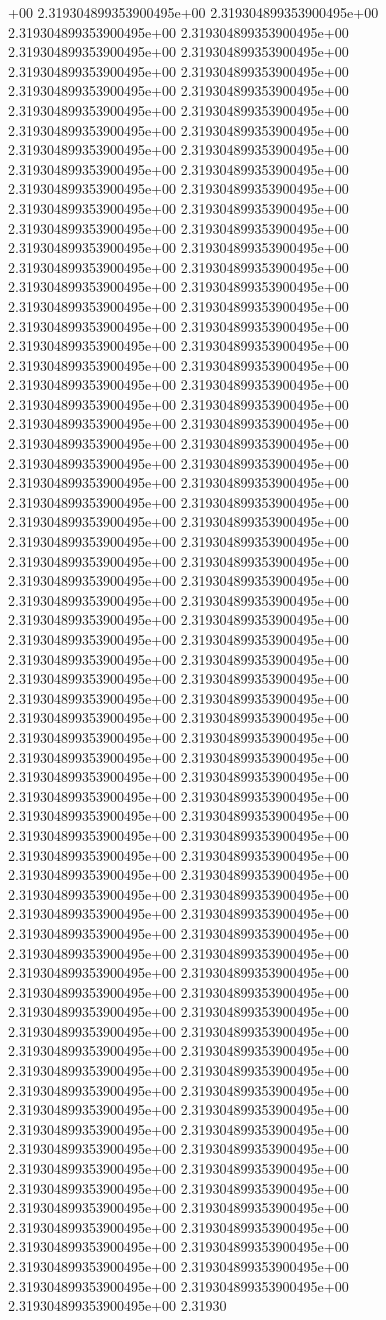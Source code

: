 +00	2.319304899353900495e+00	2.319304899353900495e+00	2.319304899353900495e+00	2.319304899353900495e+00	2.319304899353900495e+00	2.319304899353900495e+00	2.319304899353900495e+00	2.319304899353900495e+00	2.319304899353900495e+00	2.319304899353900495e+00	2.319304899353900495e+00	2.319304899353900495e+00	2.319304899353900495e+00	2.319304899353900495e+00	2.319304899353900495e+00	2.319304899353900495e+00	2.319304899353900495e+00	2.319304899353900495e+00	2.319304899353900495e+00	2.319304899353900495e+00	2.319304899353900495e+00	2.319304899353900495e+00	2.319304899353900495e+00	2.319304899353900495e+00	2.319304899353900495e+00	2.319304899353900495e+00	2.319304899353900495e+00	2.319304899353900495e+00	2.319304899353900495e+00	2.319304899353900495e+00	2.319304899353900495e+00	2.319304899353900495e+00	2.319304899353900495e+00	2.319304899353900495e+00	2.319304899353900495e+00	2.319304899353900495e+00	2.319304899353900495e+00	2.319304899353900495e+00	2.319304899353900495e+00	2.319304899353900495e+00	2.319304899353900495e+00	2.319304899353900495e+00	2.319304899353900495e+00	2.319304899353900495e+00	2.319304899353900495e+00	2.319304899353900495e+00	2.319304899353900495e+00	2.319304899353900495e+00	2.319304899353900495e+00	2.319304899353900495e+00	2.319304899353900495e+00	2.319304899353900495e+00	2.319304899353900495e+00	2.319304899353900495e+00	2.319304899353900495e+00	2.319304899353900495e+00	2.319304899353900495e+00	2.319304899353900495e+00	2.319304899353900495e+00	2.319304899353900495e+00	2.319304899353900495e+00	2.319304899353900495e+00	2.319304899353900495e+00	2.319304899353900495e+00	2.319304899353900495e+00	2.319304899353900495e+00	2.319304899353900495e+00	2.319304899353900495e+00	2.319304899353900495e+00	2.319304899353900495e+00	2.319304899353900495e+00	2.319304899353900495e+00	2.319304899353900495e+00	2.319304899353900495e+00	2.319304899353900495e+00	2.319304899353900495e+00	2.319304899353900495e+00	2.319304899353900495e+00	2.319304899353900495e+00	2.319304899353900495e+00	2.319304899353900495e+00	2.319304899353900495e+00	2.319304899353900495e+00	2.319304899353900495e+00	2.319304899353900495e+00	2.319304899353900495e+00	2.319304899353900495e+00	2.319304899353900495e+00	2.319304899353900495e+00	2.319304899353900495e+00	2.319304899353900495e+00	2.319304899353900495e+00	2.319304899353900495e+00	2.319304899353900495e+00	2.319304899353900495e+00	2.319304899353900495e+00	2.319304899353900495e+00	2.319304899353900495e+00	2.319304899353900495e+00	2.319304899353900495e+00	2.319304899353900495e+00	2.319304899353900495e+00	2.319304899353900495e+00	2.319304899353900495e+00	2.319304899353900495e+00	2.319304899353900495e+00	2.319304899353900495e+00	2.319304899353900495e+00	2.319304899353900495e+00	2.319304899353900495e+00	2.319304899353900495e+00	2.319304899353900495e+00	2.319304899353900495e+00	2.319304899353900495e+00	2.319304899353900495e+00	2.319304899353900495e+00	2.319304899353900495e+00	2.319304899353900495e+00	2.319304899353900495e+00	2.319304899353900495e+00	2.319304899353900495e+00	2.319304899353900495e+00	2.319304899353900495e+00	2.319304899353900495e+00	2.319304899353900495e+00	2.319304899353900495e+00	2.319304899353900495e+00	2.319304899353900495e+00	2.319304899353900495e+00	2.319304899353900495e+00	2.319304899353900495e+00	2.319304899353900495e+00	2.319304899353900495e+00	2.31930